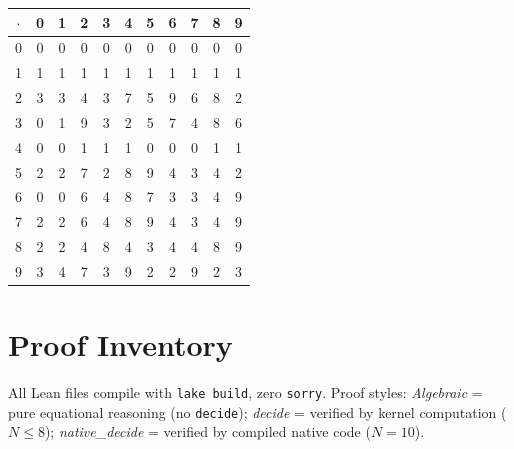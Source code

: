 \documentclass[sigconf,screen,review,anonymous]{acmart}
\newcommand{\dotop}{\cdot}
\theoremstyle{remark}
\begin{document}
\medskip
{\footnotesize
\begin{tabular}{c|cccccccccc}
$\dotop$ & 0 & 1 & 2 & 3 & 4 & 5 & 6 & 7 & 8 & 9 \\\hline
0 & 0 & 0 & 0 & 0 & 0 & 0 & 0 & 0 & 0 & 0 \\
1 & 1 & 1 & 1 & 1 & 1 & 1 & 1 & 1 & 1 & 1 \\
2 & 3 & 3 & 4 & 3 & 7 & 5 & 9 & 6 & 8 & 2 \\
3 & 0 & 1 & 9 & 3 & 2 & 5 & 7 & 4 & 8 & 6 \\
4 & 0 & 0 & 1 & 1 & 1 & 0 & 0 & 0 & 1 & 1 \\
5 & 2 & 2 & 7 & 2 & 8 & 9 & 4 & 3 & 4 & 2 \\
6 & 0 & 0 & 6 & 4 & 8 & 7 & 3 & 3 & 4 & 9 \\
7 & 2 & 2 & 6 & 4 & 8 & 9 & 4 & 3 & 4 & 9 \\
8 & 2 & 2 & 4 & 8 & 4 & 3 & 4 & 4 & 8 & 9 \\
9 & 3 & 4 & 7 & 3 & 9 & 2 & 2 & 9 & 2 & 3 \\
\end{tabular}}

\section{Proof Inventory}
\label{app:inventory}

All Lean files compile with \texttt{lake build}, zero \texttt{sorry}. Proof styles: \emph{Algebraic} = pure equational reasoning (no \texttt{decide}); \emph{decide} = verified by kernel computation ($N \leq 8$); \emph{native\_decide} = verified by compiled native code ($N = 10$).
\end{document}
